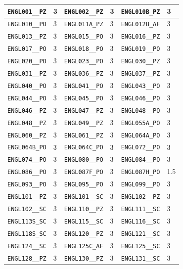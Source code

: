 \begin{longtable}{|l|l||l|l||l|l|}
    \verb|ENGL001__PZ| & 3 & \verb|ENGL002__PZ| & 3 & \verb|ENGL010B_PZ| & 3\\\hline
    \verb|ENGL010__PO| & 3 & \verb|ENGL011A_PZ| & 3 & \verb|ENGL012B_AF| & 3\\\hline
    \verb|ENGL013__PZ| & 3 & \verb|ENGL015__PO| & 3 & \verb|ENGL016__PZ| & 3\\\hline
    \verb|ENGL017__PO| & 3 & \verb|ENGL018__PO| & 3 & \verb|ENGL019__PO| & 3\\\hline
    \verb|ENGL020__PO| & 3 & \verb|ENGL023__PO| & 3 & \verb|ENGL030__PZ| & 3\\\hline
    \verb|ENGL031__PZ| & 3 & \verb|ENGL036__PZ| & 3 & \verb|ENGL037__PZ| & 3\\\hline
    \verb|ENGL040__PO| & 3 & \verb|ENGL041__PO| & 3 & \verb|ENGL043__PO| & 3\\\hline
    \verb|ENGL044__PO| & 3 & \verb|ENGL045__PO| & 3 & \verb|ENGL046__PO| & 3\\\hline
    \verb|ENGL046__PZ| & 3 & \verb|ENGL047__PZ| & 3 & \verb|ENGL048__PO| & 3\\\hline
    \verb|ENGL048__PZ| & 3 & \verb|ENGL049__PZ| & 3 & \verb|ENGL055A_PO| & 3\\\hline
    \verb|ENGL060__PZ| & 3 & \verb|ENGL061__PZ| & 3 & \verb|ENGL064A_PO| & 3\\\hline
    \verb|ENGL064B_PO| & 3 & \verb|ENGL064C_PO| & 3 & \verb|ENGL072__PO| & 3\\\hline
    \verb|ENGL074__PO| & 3 & \verb|ENGL080__PO| & 3 & \verb|ENGL084__PO| & 3\\\hline
    \verb|ENGL086__PO| & 3 & \verb|ENGL087F_PO| & 3 & \verb|ENGL087H_PO| & 1.5\\\hline
    \verb|ENGL093__PO| & 3 & \verb|ENGL095__PO| & 3 & \verb|ENGL099__PO| & 3\\\hline
    \verb|ENGL101__PZ| & 3 & \verb|ENGL101__SC| & 3 & \verb|ENGL102__PZ| & 3\\\hline
    \verb|ENGL102__SC| & 3 & \verb|ENGL110__PZ| & 3 & \verb|ENGL111__SC| & 3\\\hline
    \verb|ENGL113S_SC| & 3 & \verb|ENGL115__SC| & 3 & \verb|ENGL116__SC| & 3\\\hline
    \verb|ENGL118S_SC| & 3 & \verb|ENGL120__PZ| & 3 & \verb|ENGL121__SC| & 3\\\hline
    \verb|ENGL124__SC| & 3 & \verb|ENGL125C_AF| & 3 & \verb|ENGL125__SC| & 3\\\hline
    \verb|ENGL128__PZ| & 3 & \verb|ENGL130__PZ| & 3 & \verb|ENGL131__SC| & 3\\\hline

\end{longtable}
